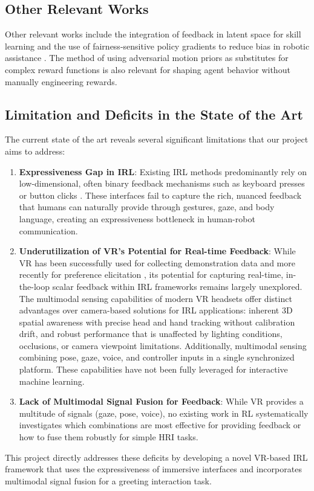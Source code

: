 \documentclass[../report.tex]{subfiles}
\begin{document}
    \subsection{Other Relevant Works}
    Other relevant works include the integration of feedback in latent space for skill learning \citep{8624972} and the use of fairness-sensitive policy gradients to reduce bias in robotic assistance \citep{10731257}. The method of using adversarial motion priors as substitutes for complex reward functions \citep{Escontrela2022} is also relevant for shaping agent behavior without manually engineering rewards.

    \subsection{Limitation and Deficits in the State of the Art}
    The current state of the art reveals several significant limitations that our project aims to address:
    \begin{enumerate}
        \item \textbf{Expressiveness Gap in IRL}: Existing IRL methods predominantly rely on low-dimensional, often binary feedback mechanisms such as keyboard presses or button clicks \citep{Faulkner2020, Loftin2014}. These interfaces fail to capture the rich, nuanced feedback that humans can naturally provide through gestures, gaze, and body language, creating an expressiveness bottleneck in human-robot communication.
        
        \item \textbf{Underutilization of VR's Potential for Real-time Feedback}: While VR has been successfully used for collecting demonstration data \citep{10904309, Mosbach2022} and more recently for preference elicitation \citep{Heuvel2025}, its potential for capturing real-time, in-the-loop scalar feedback within IRL frameworks remains largely unexplored. The multimodal sensing capabilities of modern VR headsets offer distinct advantages over camera-based solutions for IRL applications: inherent 3D spatial awareness with precise head and hand tracking without calibration drift, and robust performance that is unaffected by lighting conditions, occlusions, or camera viewpoint limitations. Additionally, multimodal sensing combining pose, gaze, voice, and controller inputs in a single synchronized platform. These capabilities have not been fully leveraged for interactive machine learning.
        
        \item \textbf{Lack of Multimodal Signal Fusion for Feedback}: While VR provides a multitude of signals (gaze, pose, voice), no existing work in RL systematically investigates which combinations are most effective for providing feedback or how to fuse them robustly for simple HRI tasks.
    \end{enumerate}

    This project directly addresses these deficits by developing a novel VR-based IRL framework that uses the expressiveness of immersive interfaces and incorporates multimodal signal fusion for a greeting interaction task.
\end{document}

